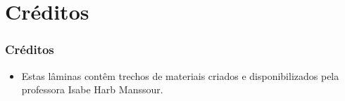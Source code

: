 \documentclass[aspectratio=169]{beamer}
\begin{document}

\section{Créditos}

\begin{frame}\frametitle{Créditos}
\begin{itemize}
	\item Estas lâminas contêm trechos de materiais criados e disponibilizados pela professora Isabe Harb Manssour.
\end{itemize}
\end{frame}

\end{document}
